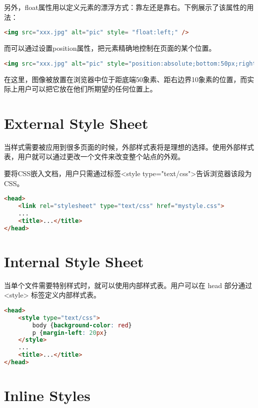 另外，float属性用以定义元素的漂浮方式：靠左还是靠右。下例展示了该属性的用法：

\begin{lstlisting}[language=HTML]
<img src="xxx.jpg" alt="pic" style= "float:left;" />
\end{lstlisting}

而可以通过设置position属性，把元素精确地控制在页面的某个位置。

\begin{lstlisting}[language=HTML]
<img src="xxx.jpg" alt="pic" style="position:absolute;bottom:50px;right:10px;" />
\end{lstlisting}

在这里，图像被放置在浏览器中位于距底端50象素、距右边界10象素的位置，而实际上用户可以把它放在他们所期望的任何位置上。

\section{External Style Sheet}


当样式需要被应用到很多页面的时候，外部样式表将是理想的选择。使用外部样式表，用户就可以通过更改一个文件来改变整个站点的外观。

要将CSS嵌入文档，用户只需通过标签<style type="text/css">告诉浏览器该段为CSS。

\begin{lstlisting}[language=HTML]
<head>
	<link rel="stylesheet" type="text/css" href="mystyle.css">
	...
	<title>...</title>
</head>
\end{lstlisting}




\section{Internal Style Sheet}


当单个文件需要特别样式时，就可以使用内部样式表。用户可以在 head 部分通过 <style> 标签定义内部样式表。


\begin{lstlisting}[language=HTML]
<head>
	<style type="text/css">
		body {background-color: red}
		p {margin-left: 20px}
	</style>
	...
	<title>...</title>
</head>
\end{lstlisting}



\section{Inline Styles}

